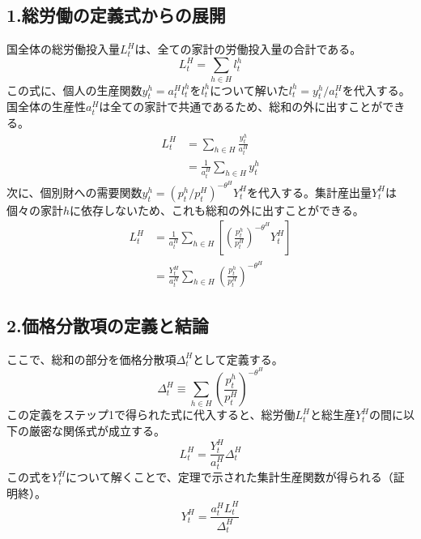 \subsection*{1.総労働の定義式からの展開}
\label{sec:appendix_production_aggregation_sub1}
国全体の総労働投入量\(L_t^H\)は、全ての家計の労働投入量の合計である。
\begin{equation}
L_t^H=\sum_{h\in H}l_t^h
\label{eq:appendix_production_aggregation_sub1_labor_def}
\end{equation}
この式に、個人の生産関数\(y_t^h=a_t^Hl_t^h\)を\(l_t^h\)について解いた\(l_t^h=y_t^h/a_t^H\)を代入する。国全体の生産性\(a_t^H\)は全ての家計で共通であるため、総和の外に出すことができる。
\begin{align}
L_t^H&=\sum_{h\in H}\frac{y_t^h}{a_t^H} \label{eq:appendix_production_aggregation_sub1_subst1_step} \\
&=\frac{1}{a_t^H}\sum_{h\in H}y_t^h
\label{eq:appendix_production_aggregation_sub1_subst1_final}
\end{align}
次に、個別財への需要関数\(y_t^h=\left(p_t^h/p_t^H\right)^{-\theta^H}Y_t^H\)を代入する。集計産出量\(Y_t^H\)は個々の家計\(h\)に依存しないため、これも総和の外に出すことができる。
\begin{align}
L_t^H&=\frac{1}{a_t^H}\sum_{h\in H}\left[\left(\frac{p_t^h}{p_t^H}\right)^{-\theta^H}Y_t^H\right] \label{eq:appendix_production_aggregation_sub1_subst2_step} \\
&=\frac{Y_t^H}{a_t^H}\sum_{h\in H}\left(\frac{p_t^h}{p_t^H}\right)^{-\theta^H}
\label{eq:appendix_production_aggregation_sub1_subst2_final}
\end{align}

\subsection*{2.価格分散項の定義と結論}
\label{sec:appendix_production_aggregation_sub2}
ここで、総和の部分を価格分散項\(\Delta_t^H\)として定義する。
\begin{equation}
\Delta_t^H\equiv\sum_{h\in H}\left(\frac{p_t^h}{p_t^H}\right)^{-\theta^H}
\label{eq:appendix_production_aggregation_sub2_dispersion_id}
\end{equation}
この定義をステップ1で得られた式に代入すると、総労働\(L_t^H\)と総生産\(Y_t^H\)の間に以下の厳密な関係式が成立する。
\begin{equation}
L_t^H=\frac{Y_t^H}{a_t^H}\Delta_t^H
\label{eq:appendix_production_aggregation_sub2_relation_pre}
\end{equation}
この式を\(Y_t^H\)について解くことで、定理で示された集計生産関数が得られる（証明終）。
\begin{equation}
Y_t^H=\frac{a_t^HL_t^H}{\Delta_t^H}
\label{eq:appendix_production_aggregation_sub2_final_result}
\end{equation}